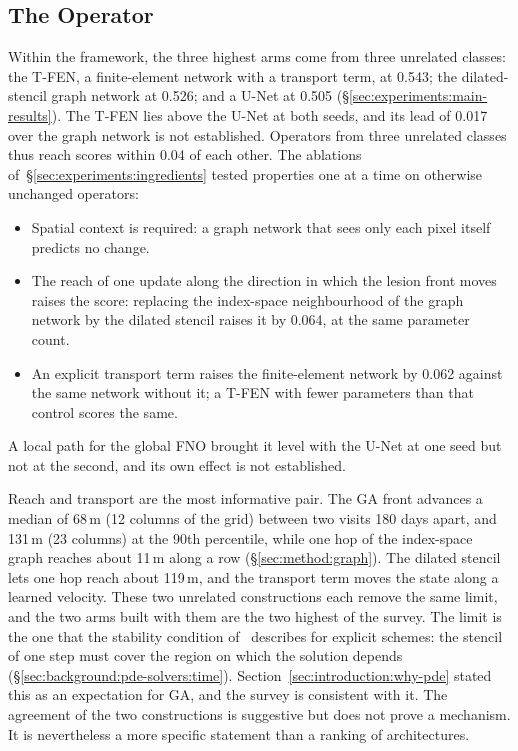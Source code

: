 \subsection{The Operator}
\label{sec:discussion:operator}

Within the framework, the three highest arms come from three unrelated
classes: the T-FEN, a finite-element network with a transport term, at
0.543; the dilated-stencil graph network at 0.526; and a U-Net at 0.505
(\S\ref{sec:experiments:main-results}). The T-FEN lies above the U-Net at
both seeds, and its lead of 0.017 over the graph network is not
established. Operators from three unrelated classes thus reach scores
within 0.04 of each other. The ablations
of~\S\ref{sec:experiments:ingredients} tested properties one at a time on
otherwise unchanged operators:
\begin{itemize}
  \item Spatial context is required: a graph network that sees only each
    pixel itself predicts no change.
  \item The reach of one update along the direction in which the lesion
    front moves raises the score: replacing the index-space
    neighbourhood of the graph network by the dilated stencil raises it
    by 0.064, at the same parameter count.
  \item An explicit transport term raises the finite-element network by
    0.062 against the same network without it; a T-FEN with fewer
    parameters than that control scores the same.
\end{itemize}
A local path for the global FNO brought it level with the U-Net at one
seed but not at the second, and its own effect is not established.

Reach and transport are the most informative pair. The GA front advances
a median of 68\,\textmu{}m (12 columns of the grid) between two visits 180
days apart, and 131\,\textmu{}m (23 columns) at the 90th percentile, while
one hop of the index-space graph reaches about 11\,\textmu{}m
along a row (\S\ref{sec:method:graph}). The dilated stencil lets one hop
reach about 119\,\textmu{}m, and the transport term moves the state along
a learned velocity. These two unrelated constructions each remove the same
limit, and the two arms built with them are the two highest of the survey.
The limit is the one that the stability condition of~\citet{Courant1928}
describes for explicit schemes: the stencil of one step must cover the
region on which the solution depends
(\S\ref{sec:background:pde-solvers:time}).
Section~\ref{sec:introduction:why-pde} stated this as an expectation for
GA, and the survey is consistent with it. The agreement of the two
constructions is suggestive but does not prove a mechanism. It is
nevertheless a more specific statement than a ranking of architectures.

